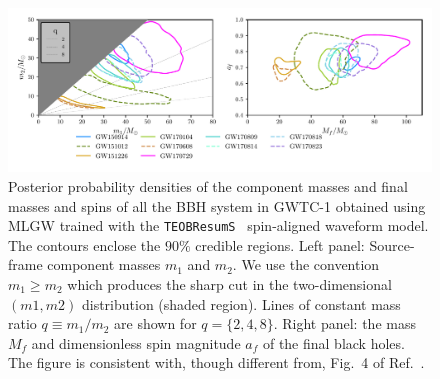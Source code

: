 \begin{figure}[t]
	\centering
    \includegraphics[width=\textwidth]{img/posterior_masses_final.pdf}
	\caption{
	Posterior probability densities of the component masses and final masses and spins 
	of all the BBH system in GWTC-1 obtained using MLGW trained with 
	the {\tt TEOBResumS}~\cite{Nagar:2020pcj} spin-aligned waveform model. 
	The contours enclose the $90\%$ credible regions. Left panel: Source-frame component 
	masses $m_1$ and $m_2$. We use the convention $m_1\geq m_2$ which produces 
	the sharp cut in the two-dimensional $(m1,m2)$ distribution (shaded region). Lines of
	constant mass ratio $q\equiv m_1/m_2$ are shown for $q=\{2,4,8\}$. Right panel: the mass $M_f$
	and dimensionless spin magnitude $a_f$ of the final black holes. The figure is consistent with, though 
	different from, Fig.~4 of Ref.~\cite{LIGOScientific:2018mvr}.
}
	\label{fig:gwtc1-summary}
\end{figure}
